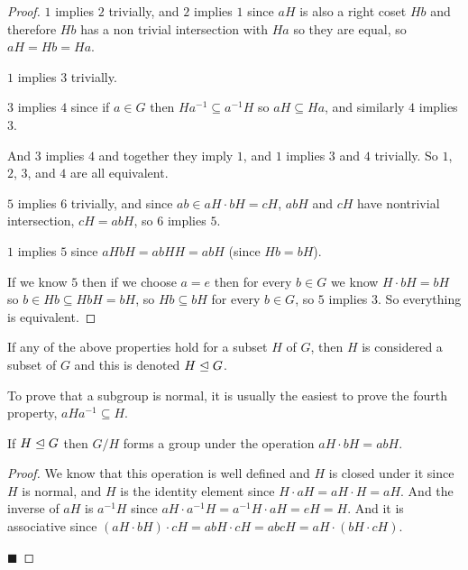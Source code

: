 \begin{proof}

    \blist
        \item $1$ implies $2$ trivially, and $2$ implies $1$ since $aH$ is also a right coset $Hb$ and therefore $Hb$ has a non trivial intersection with $Ha$ so they are equal, so $aH=Hb=Ha$.
        \item $1$ implies $3$ trivially.
        \item $3$ implies $4$ since if $a\in G$ then $Ha^{-1}\subseteq a^{-1}H$ so $aH\subseteq Ha$, and similarly $4$ implies $3$.
        \item And $3$ implies $4$ and together they imply $1$, and $1$ implies $3$ and $4$ trivially.
        So $1$, $2$, $3$, and $4$ are all equivalent.
        \item $5$ implies $6$ trivially, and since $ab\in aH\cdot bH=cH$, $abH$ and $cH$ have nontrivial intersection, $cH=abH$, so $6$ implies $5$.
        \item $1$ implies $5$ since $aHbH=abHH=abH$ (since $Hb=bH$).
        \item If we know $5$ then if we choose $a=e$ then for every $b\in G$ we know $H\cdot bH=bH$ so $b\in Hb\subseteq HbH=bH$, so $Hb\subseteq bH$ for every $b\in G$, so $5$ implies $3$.
        So everything is equivalent.
    \elist

\end{proof}

\begin{defn*}

    If any of the above properties hold for a subset $H$ of $G$, then $H$ is considered a  subset of $G$ and this is denoted $H\trianglelefteq G$.

\end{defn*}

To prove that a subgroup is normal, it is usually the easiest to prove the fourth property, $aHa^{-1}\subseteq H$.

\begin{prop*}

    If $H\trianglelefteq G$ then $G/H$ forms a group under the operation $aH\cdot bH=abH$.

\end{prop*}

\begin{proof}

    We know that this operation is well defined and $H$ is closed under it since $H$ is normal, and $H$ is the identity element since $H\cdot aH=aH\cdot H=aH$.
    And the inverse of $aH$ is $a^{-1}H$ since $aH\cdot a^{-1}H=a^{-1}H\cdot aH=eH=H$.
    And it is associative since $(aH\cdot bH)\cdot cH=abH\cdot cH=abcH=aH\cdot(bH\cdot cH)$.

    \hfill$\blacksquare$

\end{proof}



